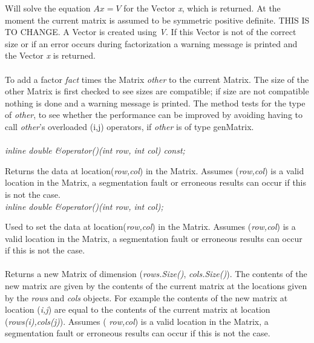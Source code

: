 Will solve the equation {\em $Ax=V$} for the Vector {\em x}, which is
returned. At the moment the current matrix is assumed to be symmetric
positive definite. THIS IS TO CHANGE. A Vector is created using
{\em V}. If this Vector is not of the correct size or if an error occurs
during factorization a warning message is printed and the Vector {\em x}
is returned. \\ 

 \\ 
To add a factor {\em fact} times the Matrix {\em other} to the current
Matrix. The size of the other Matrix is first checked to see sizes are 
compatible; if size are not compatible nothing is done and a warning
message is printed. The method tests for the type of {\em other}, to see
whether the performance can be improved by avoiding having to call
{\em other}'s overloaded (i,j) operators, if {\em other} is of type
genMatrix. \\ 


  \\
{\em  inline double \&operator()(int row, int col) const;} 

Returns the data at location({\em row,col}) in the Matrix. Assumes
({\em row,col}) is a valid location in the Matrix, a segmentation
fault or erroneous results can occur if this is not the case.\\

{\em  inline double \&operator()(int row, int col);} 

Used to set the data at location({\em row,col}) in the Matrix. Assumes
({\em row,col}) is a valid location in the Matrix, a segmentation
fault or erroneous results can occur if this is not the case. \\

\\ 
Returns a new Matrix of dimension ({\em rows.Size()}, {\em
cols.Size()}). The contents of the new matrix are given by the
contents of the current matrix at the locations given by the {\em
rows} and {\em cols} objects. For example the contents of the new
matrix at location ({\em i,j}) are equal to the contents of the
current matrix at location ({\em rows(i),cols(j)}). Assumes ({\em
row,col}) is a valid location in the Matrix, a segmentation fault or
erroneous results can occur if this is not the case. \\

